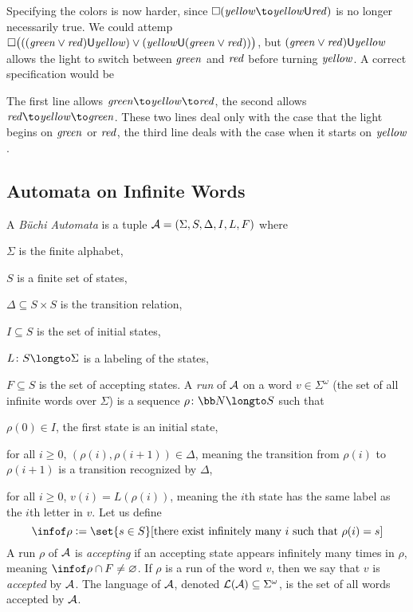    Specifying the colors is now harder, since $\square(\ye\to\ye\U\re)$ is no longer necessarily true.
    We could attemp $\square\bigl((({\it green}\lor{\it red}){\sf U}{\it yellow})\lor({\it yellow}{\sf U}({\it green}\lor{\it red}))\bigr)$, but $({\it green}\lor{\it red}){\sf U}{\it yellow}$ allows the light to switch between ${\it green}$ and ${\it red}$ before turning ${\it yellow}$.
    A correct specification would be

    \medskip
    \centerline{\vbox{\halign{$#$\hfil&\hfil$#$&$#$\hfil\cr
        \square\bigl(&(\gr\to&(\gr\U(\ye\land(\ye\U\re))))\cr
        \land        &(\re\to&(\re\U(\ye\land(\ye\U\gr))))\cr
        \land        &(\ye\to&(\ye\U(\re\U\gr)))\bigr)\cr
    }}}
    \medskip

    The first line allows $\gr\to\ye\to\re$, the second allows $\re\to\ye\to\gr$.
    These two lines deal only with the case that the light begins on ${\it green}$ or ${\it red}$, the third line deals with the case when it starts on ${\it yellow}$.

\eexam

\subsection{Automata on Infinite Words}

A {\it B\"uchi Automata} is a tuple ${\cal A}=(\Sigma,S,\Delta,I,L,F)$ where
\benum
    \item $\Sigma$ is the finite alphabet,
    \item $S$ is a finite set of states,
    \item $\Delta\subseteq S\times S$ is the transition relation,
    \item $I\subseteq S$ is the set of initial states,
    \item $L\colon S\longto\Sigma$ is a labeling of the states,
    \item $F\subseteq S$ is the set of accepting states.
\eenum
A {\it run} of ${\cal A}$ on a word $v\in\Sigma^\omega$ (the set of all infinite words over $\Sigma$) is a sequence $\rho\colon{\bb N}\longto S$ such that
\benum
    \item $\rho(0)\in I$, the first state is an initial state,
    \item for all $i\geq0$, $(\rho(i),\rho(i+1))\in\Delta$, meaning the transition from $\rho(i)$ to $\rho(i+1)$ is a transition recognized by $\Delta$,
    \item for all $i\geq0$, $v(i)=L(\rho(i))$, meaning the $i$th state has the same label as the $i$th letter in $v$.
\eenum
Let us define
$$ \infof\rho \coloneqq \set{s\in S}[\hbox{there exist infinitely many $i$ such that $\rho(i)=s$}] $$
A run $\rho$ of ${\cal A}$ is {\it accepting} if an accepting state appears infinitely many times in $\rho$, meaning $\infof\rho\cap F\neq\varnothing$.
If $\rho$ is a run of the word $v$, then we say that $v$ is {\it accepted} by ${\cal A}$.
The language of ${\cal A}$, denoted ${\cal L}({\cal A})\subseteq\Sigma^\omega$, is the set of all words accepted by ${\cal A}$.

